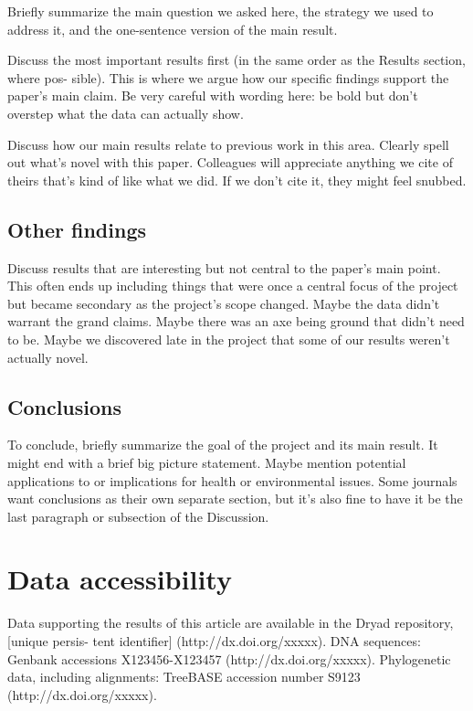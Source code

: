 \documentclass[11pt]{article}
\begin{document}
Briefly summarize the main question we asked here, the strategy we used to address it, and the one-sentence version of the main result.

Discuss the most important results first (in the same order as the Results section, where pos- sible). This is where we argue how our specific findings support the paper's main claim. Be very careful with wording here: be bold but don't overstep what the data can actually show.

Discuss how our main results relate to previous work in this area. Clearly spell out what's novel with this paper. Colleagues will appreciate anything we cite of theirs that's kind of like what we did. If we don't cite it, they might feel snubbed.

\subsection{Other findings}

Discuss results that are interesting but not central to the paper's main point. This often ends up including things that were once a central focus of the project but became secondary as the project's scope changed. Maybe the data didn't warrant the grand claims. Maybe there was an axe being ground that didn't need to be. Maybe we discovered late in the project that some of our results weren't actually novel.

\subsection{Conclusions}

To conclude, briefly summarize the goal of the project and its main result. It might end with a brief big picture statement. Maybe mention potential applications to or implications for health or environmental issues. Some journals want conclusions as their own separate section, but it's also fine to have it be the last paragraph or subsection of the Discussion. 



\newpage

\section{Data accessibility}

Data supporting the results of this article are available in the Dryad repository, [unique persis- tent identifier] (http://dx.doi.org/xxxxx). DNA sequences: Genbank accessions X123456-X123457 (http://dx.doi.org/xxxxx). Phylogenetic data, including alignments: TreeBASE accession number S9123 (http://dx.doi.org/xxxxx).
\end{document}
